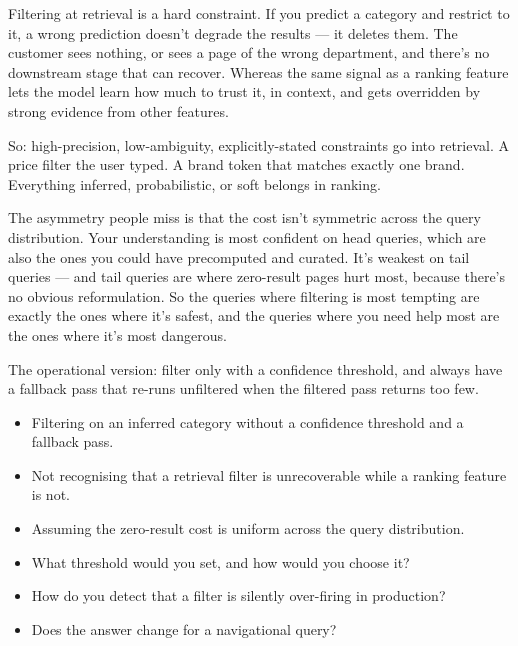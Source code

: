 \documentclass[10pt,twoside]{book}
\newcommand{\lab}[1]{\par\vspace{5pt}\noindent{\sffamily\footnotesize\bfseries\color{accent}#1}\par\vspace{1pt}}
\newcommand{\flab}[1]{\par\vspace{5pt}\noindent{\sffamily\footnotesize\bfseries\color{flag}#1}\par\vspace{1pt}}
\begin{document}
Filtering at retrieval is a hard constraint. If you predict a category and restrict to it, a wrong prediction doesn't degrade the results --- it deletes them. The customer sees nothing, or sees a page of the wrong department, and there's no downstream stage that can recover. Whereas the same signal as a ranking feature lets the model learn how much to trust it, in context, and gets overridden by strong evidence from other features.\par\vspace{3pt}
So: high-precision, low-ambiguity, explicitly-stated constraints go into retrieval. A price filter the user typed. A brand token that matches exactly one brand. Everything inferred, probabilistic, or soft belongs in ranking.\par\vspace{3pt}
The asymmetry people miss is that the cost isn't symmetric across the query distribution. Your understanding is most confident on head queries, which are also the ones you could have precomputed and curated. It's weakest on tail queries --- and tail queries are where zero-result pages hurt most, because there's no obvious reformulation. So the queries where filtering is most tempting are exactly the ones where it's safest, and the queries where you need help most are the ones where it's most dangerous.\par\vspace{3pt}
The operational version: filter only with a confidence threshold, and always have a fallback pass that re-runs unfiltered when the filtered pass returns too few.\par\vspace{3pt}
\flab{Loses the signal}
\begin{itemize}
\item Filtering on an inferred category without a confidence threshold and a fallback pass.
\item Not recognising that a retrieval filter is unrecoverable while a ranking feature is not.
\item Assuming the zero-result cost is uniform across the query distribution.
\end{itemize}
\lab{Then they ask}
\begin{itemize}
\item What threshold would you set, and how would you choose it?
\item How do you detect that a filter is silently over-firing in production?
\item Does the answer change for a navigational query?
\end{itemize}
\end{document}
